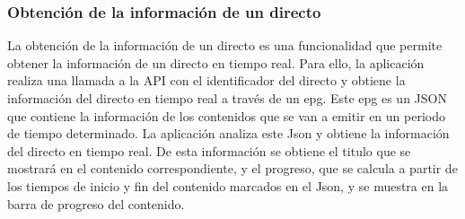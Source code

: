 \subsubsection{Obtención de la información de un directo}
\label{sec:obtencion_informacion_directo}

La obtención de la información de un directo es una funcionalidad que permite obtener la información de un directo en tiempo real. Para ello, la aplicación realiza una
llamada a la API con el identificador del directo y obtiene la información del directo en tiempo real a través de un epg. Este epg es un JSON que contiene la información
de los contenidos que se van a emitir en un periodo de tiempo determinado. La aplicación analiza este Json y obtiene la información del directo en tiempo real. De esta 
información se obtiene el titulo que se mostrará en el contenido correspondiente, y el progreso, que se calcula a partir de los tiempos de inicio y fin del contenido marcados
en el Json, y se muestra en la barra de progreso del contenido.

